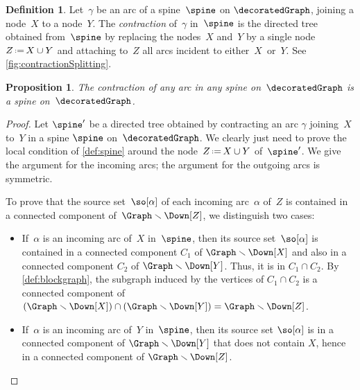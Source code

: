 \documentclass{amsart}
\newtheorem{proposition}[theorem]{Proposition}
\theoremstyle{definition}
\newtheorem{definition}[theorem]{Definition}
\newcommand{\ssm}{\smallsetminus} %
\newcommand{\eqdef}{\mbox{\,\raisebox{0.2ex}{\scriptsize\ensuremath{\mathrm:}}\ensuremath{=}\,}} %
\newcommand{\darkblue}{\color{darkblue}} %
\newcommand{\defn}[1]{\textsl{\darkblue #1}} %
\begin{document}
\begin{definition}
  \label{def:arccontraction}
  Let~$\gamma$ be an arc of a spine~$\spine$ on $\decoratedGraph$, joining a node~$X$ to a node~$Y$.
  The \defn{contraction} of~$\gamma$ in~$\spine$ is the directed tree obtained from~$\spine$ by replacing the nodes~$X$ and~$Y$ by a single node~$Z \eqdef X \cup Y$ and attaching to~$Z$ all arcs incident to either~$X$~or~$Y$.
  See \cref{fig:contractionSplitting}.
\end{definition}

\begin{proposition}
  \label{prop:arccontraction}
  The contraction of any arc in any spine on~$\decoratedGraph$ is a spine on~$\decoratedGraph$.
\end{proposition}

\begin{proof} 
  Let $\spine'$ be a directed tree obtained by contracting an arc $\gamma$ joining~$X$ to~$Y$ in a spine $\spine$ on~$\decoratedGraph$.
  We clearly just need to prove the local condition of \cref{def:spine} around the node~$Z \eqdef X \cup Y$ of~$\spine'$.
  We give the argument for the incoming arcs; the argument for the outgoing arcs is symmetric. 

  To prove that the source set~$\so[\alpha]$ of each incoming arc~$\alpha$ of~$Z$ is contained in a connected component of~$\Graph \ssm \Down[Z]$, we distinguish two cases:
  \begin{itemize}
    \item If~$\alpha$ is an incoming arc of~$X$ in~$\spine$, then its source set~$\so[\alpha]$ is contained in a connected component $C_1$ of $\Graph \ssm \Down[X]$ and also in a connected component $C_2$ of $\Graph \ssm \Down[Y]$. Thus, it is in $C_1 \cap C_2$. By \cref{def:blockgraph}, the subgraph induced by the vertices of $C_1 \cap C_2$ is a connected component of $(\Graph \ssm \Down[X]) \cap (\Graph \ssm \Down[Y]) = \Graph \ssm \Down[Z]$.
    \item If~$\alpha$ is an incoming arc of~$Y$ in~$\spine$, then its source set $\so[\alpha]$ is in a connected component of $\Graph \ssm \Down[Y]$ that does not contain $X$, hence in a connected component of $\Graph \ssm \Down[Z]$.
  \end{itemize}


\end{proof}
\end{document}
